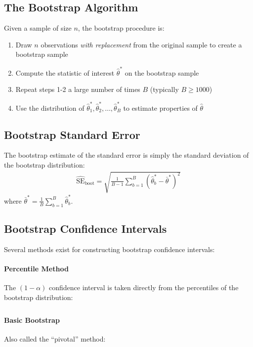 \subsection{The Bootstrap Algorithm}
Given a sample of size $n$, the bootstrap procedure is:
\begin{enumerate}
	\item Draw $n$ observations \emph{with replacement} from the original sample to create a bootstrap sample
	\item Compute the statistic of interest $\hat{\theta}^*$ on the bootstrap sample
	\item Repeat steps 1-2 a large number of times $B$ (typically $B \geq 1000$)
	\item Use the distribution of $\hat{\theta}^*_1, \hat{\theta}^*_2, \ldots, \hat{\theta}^*_B$ to estimate properties of $\hat{\theta}$
\end{enumerate}

\subsection{Bootstrap Standard Error}
The bootstrap estimate of the standard error is simply the standard deviation of the bootstrap distribution:
\begin{align}
	\widehat{\text{SE}}_\text{boot} = \sqrt{\frac{1}{B-1}\sum_{b=1}^{B}(\hat{\theta}^*_b - \bar{\theta}^*)^2}
\end{align}
where $\bar{\theta}^* = \frac{1}{B}\sum_{b=1}^B \hat{\theta}^*_b$.

\subsection{Bootstrap Confidence Intervals}
Several methods exist for constructing bootstrap confidence intervals:

\paragraph{Percentile Method} The $(1-\alpha)$ confidence interval is taken directly from the percentiles of the bootstrap distribution:
\begin{align}
	[\hat{\theta}^*_{(\alpha/2)}, \hat{\theta}^*_{(1-\alpha/2)}]
\end{align}

\paragraph{Basic Bootstrap} Also called the ``pivotal'' method:
\begin{align}
	[2\hat{\theta} - \hat{\theta}^*_{(1-\alpha/2)}, 2\hat{\theta} - \hat{\theta}^*_{(\alpha/2)}]
\end{align}

